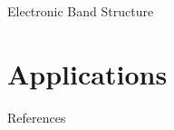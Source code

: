 \documentclass[10pt,compress]{beamer}
\begin{document}
\begin{frame}[allowframebreaks=1.00]{Electronic Band Structure}
    

    

    
\end{frame}


\section{Applications}

\begin{frame}[allowframebreaks=0.9]{References}
\AtNextBibliography{\tiny}
\nocite{*}
\printbibliography
\end{frame}
\end{document}
